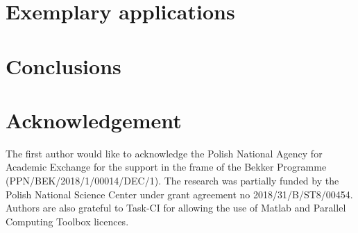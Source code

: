 \documentclass[preprint,12pt]{elsarticle}
\begin{document}
	\section{Exemplary applications}
	\section{Conclusions}
	
	\section*{Acknowledgement}
	The first author would like to acknowledge the Polish National Agency for Academic Exchange for the support in the frame of the Bekker Programme (PPN/BEK/2018/1/00014/DEC/1). The research was partially funded by the Polish National Science Center under grant agreement no 2018/31/B/ST8/00454. Authors are also grateful to Task-CI for allowing the use of Matlab and Parallel Computing Toolbox licences. 
	
	
	
	
    
	{}
\end{document}
